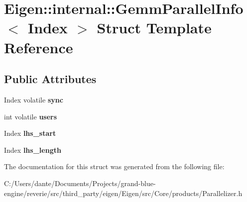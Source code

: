 \hypertarget{struct_eigen_1_1internal_1_1_gemm_parallel_info}{}\section{Eigen\+::internal\+::Gemm\+Parallel\+Info$<$ Index $>$ Struct Template Reference}
\label{struct_eigen_1_1internal_1_1_gemm_parallel_info}
\subsection*{Public Attributes}
\begin{DoxyCompactItemize}
\item 
\mbox{\label{struct_eigen_1_1internal_1_1_gemm_parallel_info_addd681205a1798c16f2373f15e923681}} 
Index volatile {\bfseries sync}
\item 
\mbox{\label{struct_eigen_1_1internal_1_1_gemm_parallel_info_ae2a039eef23196ca53108a2d3b8dc319}} 
int volatile {\bfseries users}
\item 
\mbox{\label{struct_eigen_1_1internal_1_1_gemm_parallel_info_a7a6a21f9b9b4a9fa4833659509333fdb}} 
Index {\bfseries lhs\+\_\+start}
\item 
\mbox{\label{struct_eigen_1_1internal_1_1_gemm_parallel_info_a6709199f56602a45662c9eb6c1178dd2}} 
Index {\bfseries lhs\+\_\+length}
\end{DoxyCompactItemize}


The documentation for this struct was generated from the following file\+:\begin{DoxyCompactItemize}
\item 
C\+:/\+Users/dante/\+Documents/\+Projects/grand-\/blue-\/engine/reverie/src/third\+\_\+party/eigen/\+Eigen/src/\+Core/products/Parallelizer.\+h\end{DoxyCompactItemize}
